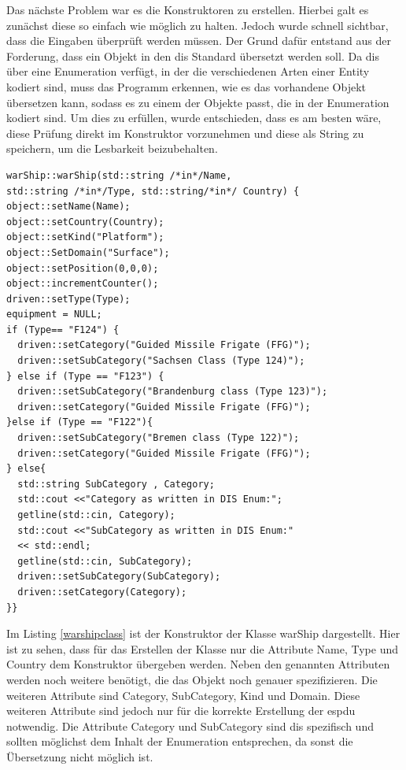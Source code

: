 Das nächste Problem war es die Konstruktoren zu erstellen. Hierbei galt es zunächst diese so einfach wie möglich zu halten. Jedoch wurde schnell sichtbar, dass die Eingaben überprüft werden müssen. Der Grund dafür entstand aus der Forderung, dass ein Objekt in den \ac{dis} Standard übersetzt werden soll. Da \ac{dis} über eine Enumeration verfügt, in der die verschiedenen Arten einer Entity kodiert sind, muss das Programm erkennen, wie es das vorhandene Objekt übersetzen kann, sodass es zu einem der Objekte passt, die in der Enumeration kodiert sind. Um dies zu erfüllen, wurde entschieden, dass es am besten wäre, diese Prüfung direkt im Konstruktor vorzunehmen und diese als String zu speichern, um die Lesbarkeit beizubehalten.   
\begin{lstlisting}[caption =Konstruktor  \glqq warShip\grqq{} Klasse ,label=warshipclass]
warShip::warShip(std::string /*in*/Name,
std::string /*in*/Type, std::string/*in*/ Country) {
object::setName(Name);
object::setCountry(Country);
object::setKind("Platform");
object::SetDomain("Surface");
object::setPosition(0,0,0);
object::incrementCounter();
driven::setType(Type);
equipment = NULL;
if (Type== "F124") {
  driven::setCategory("Guided Missile Frigate (FFG)");
  driven::setSubCategory("Sachsen Class (Type 124)");
} else if (Type == "F123") {
  driven::setSubCategory("Brandenburg class (Type 123)");
  driven::setCategory("Guided Missile Frigate (FFG)");
}else if (Type == "F122"){
  driven::setSubCategory("Bremen class (Type 122)");
  driven::setCategory("Guided Missile Frigate (FFG)");
} else{
  std::string SubCategory , Category;
  std::cout <<"Category as written in DIS Enum:";
  getline(std::cin, Category);
  std::cout <<"SubCategory as written in DIS Enum:"
  << std::endl;
  getline(std::cin, SubCategory);
  driven::setSubCategory(SubCategory);
  driven::setCategory(Category);
}}
\end{lstlisting}
Im Listing \ref{warshipclass} ist der Konstruktor der Klasse \glqq warShip\grqq{} dargestellt. Hier ist zu sehen, dass für das Erstellen der Klasse nur die Attribute \glqq Name\grqq{}, \glqq Type\grqq{} und \glqq Country\grqq{} dem Konstruktor übergeben werden. Neben den genannten Attributen werden noch weitere benötigt, die das Objekt noch genauer spezifizieren.
Die weiteren Attribute sind  \glqq Category\grqq{}, \glqq SubCategory\grqq{}, \glqq Kind\grqq{} und  \glqq Domain\grqq{}. Diese weiteren Attribute sind jedoch nur für die korrekte Erstellung der \ac{espdu} notwendig.
Die Attribute   \glqq Category\grqq{} und \glqq SubCategory\grqq{} sind \ac{dis} spezifisch und sollten möglichst dem Inhalt der Enumeration entsprechen, da sonst die Übersetzung nicht möglich ist. 

